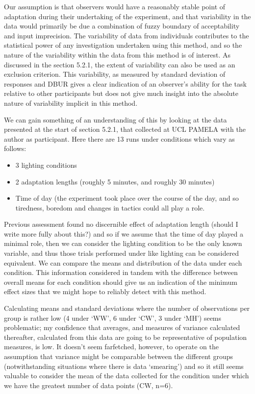 Our assumption is that observers would have a reasonably stable point of adaptation during their undertaking of the experiment, and that variability in the data would primarily be due a combination of fuzzy boundary of acceptability and input imprecision. The variability of data from individuals contributes to the statistical power of any investigation undertaken using this method, and so the nature of the variability within the data from this method is of interest. As discussed in the section 5.2.1, the extent of variability can also be used as an exclusion criterion. This variability, as measured by standard deviation of responses and DBUR gives a clear indication of an observer's ability for the task relative to other participants but does not give much insight into the absolute nature of variability implicit in this method.

We can gain something of an understanding of this by looking at the data presented at the start of section 5.2.1, that collected at UCL PAMELA with the author as participant. Here there are 13 runs under conditions which vary as follows:

\begin{itemize}
    \item 3 lighting conditions
    \item 2 adaptation lengths (roughly 5 minutes, and roughly 30 minutes)
    \item Time of day (the experiment took place over the course of the day, and so tiredness, boredom and changes in tactics could all play a role.
\end{itemize}
	
Previous assessment found no discernible effect of adaptation length (should I write more fully about this?) and so if we assume that the time of day played a minimal role, then we can consider the lighting condition to be the only known variable, and thus those trials performed under like lighting can be considered equivalent.
We can compare the means and distribution of the data under each condition. This information considered in tandem with the difference between overall means for each condition should give us an indication of the minimum effect sizes that we might hope to reliably detect with this method.

Calculating means and standard deviations where the number of observations per group is rather low (4 under `WW', 6 under `CW', 3 under `MH') seems problematic; my confidence that averages, and measures of variance calculated thereafter, calculated from this data are going to be representative of population measures, is low. It doesn't seem farfetched, however, to operate on the assumption that variance might be comparable between the different groups (notwithstanding situations where there is data `smearing') and so it still seems valuable to consider the mean of the data collected for the condition under which we have the greatest number of data points (CW, n=6).

